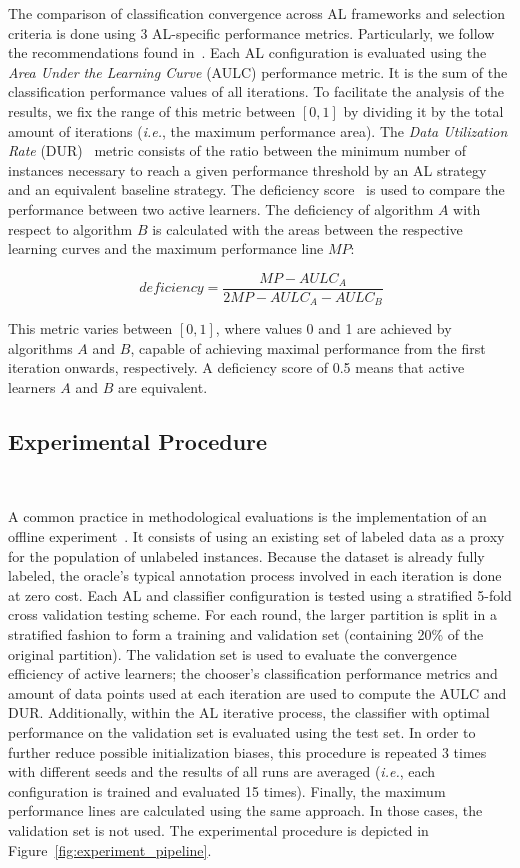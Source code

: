 \documentclass[preprint,12pt]{elsarticle}
\begin{document}
The comparison of classification convergence across AL frameworks and
selection criteria is done using 3 AL-specific performance metrics.
Particularly, we follow the recommendations found in~\cite{Kottke2017}. Each
AL configuration is evaluated using the \textit{Area Under the Learning Curve}
(AULC) performance metric. It is the sum of the classification performance
values of all iterations. To facilitate the analysis of the results, we fix
the range of this metric between $[0,1]$ by dividing it by the total amount of
iterations (\textit{i.e.}, the maximum performance area). The \textit{Data
Utilization Rate} (DUR)~\cite{Reitmaier2013} metric consists of the ratio
between the minimum number of instances necessary to reach a given
performance threshold by an AL strategy and an equivalent baseline strategy.
The deficiency score~\cite{Yanik2015} is used to compare the performance
between two active learners. The deficiency of algorithm $A$ with respect to
algorithm $B$ is calculated with the areas between the respective learning
curves and the maximum performance line $MP$:

\begin{equation}~\label{eq:deficiency}
    deficiency = \frac{MP-AULC_A}{2MP-AULC_A-AULC_B} 
\end{equation}

This metric varies between $[0,1]$, where values 0 and 1 are achieved by
algorithms $A$ and $B$, capable of achieving maximal performance from the first
iteration onwards, respectively. A deficiency score of 0.5 means that active
learners $A$ and $B$ are equivalent.

\subsection{Experimental Procedure}~\label{sec:experimental_procedure}

A common practice in methodological evaluations is the implementation of an
offline experiment~\cite{Kagy2019}. It consists of using an existing set of
labeled data as a proxy for the population of unlabeled instances. Because the
dataset is already fully labeled, the oracle's typical annotation process
involved in each iteration is done at zero cost. Each AL and classifier
configuration is tested using a stratified 5-fold cross validation testing
scheme. For each round, the larger partition is split in a stratified fashion
to form a training and validation set (containing 20\% of the original
partition).  The validation set is used to evaluate the convergence efficiency
of active learners; the chooser's classification performance metrics and
amount of data points used at each iteration are used to compute the AULC and
DUR\@.  Additionally, within the AL iterative process, the classifier with
optimal performance on the validation set is evaluated using the test set. In
order to further reduce possible initialization biases, this procedure is
repeated 3 times with different seeds and the results of all runs are averaged
(\textit{i.e.}, each configuration is trained and evaluated 15 times).
Finally, the maximum performance lines are calculated using the same approach.
In those cases, the validation set is not used. The experimental procedure is
depicted in Figure~\ref{fig:experiment_pipeline}.
\end{document}
